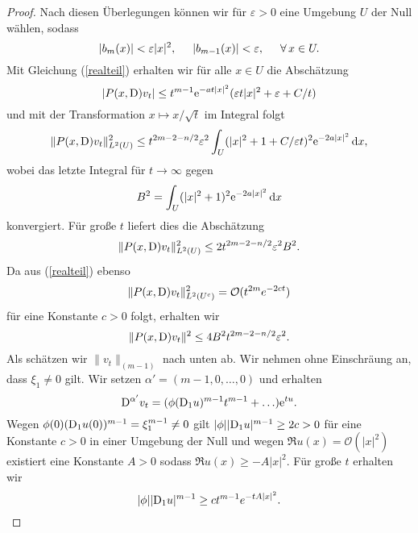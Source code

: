 \begin{proof}
Nach diesen Überlegungen können wir für $\varepsilon >0$ eine Umgebung $U$ der Null wählen, sodass
\begin{equation}
|b_m(x)| < \varepsilon |x|^2, \hspace{0.5cm} |b_{m-1}(x)| < \varepsilon, \hspace{0.5cm} \forall \, x \in U.
\end{equation}
Mit Gleichung (\ref{realteil}) erhalten wir für alle $x\in U$ die Abschätzung
\begin{equation}
|P(x,\mathrm D)v_t| \le t^{m-1} \mathrm e^{-at|x|^2}(\varepsilon t |x|^2 + \varepsilon + C/t)
\end{equation}
und mit der Transformation $x \mapsto x/\sqrt{t}$ im Integral folgt
\begin{equation}
\lVert P(x,\mathrm D) v_t \rVert_{L^2(U)} ^2 \le t^{2m-2-n/2} \varepsilon^2 \int_U (|x|^2 + 1 +C/\varepsilon t)^2 \mathrm e^{-2a|x|^2} \,\mathrm d x,
\end{equation}
wobei das letzte Integral für $t \rightarrow \infty$ gegen
\begin{equation}
B^2 = \int_U (|x|^2 + 1)^2 \mathrm e^{-2a|x|^2} \,\mathrm d x
\end{equation}
konvergiert. Für große $t$ liefert dies die Abschätzung
\begin{equation}
\lVert P(x,\mathrm D) v_t \rVert_{L^2(U)} ^2 \le 2 t^{2m-2-n/2} \varepsilon^2  B^2.
\end{equation}
Da aus (\ref{realteil}) ebenso
\begin{equation}
\lVert P(x,\mathrm D) v_t \rVert_{L^2(U^c)} ^2 = \mathcal{O}(t^{2m}e^{-2ct})
\end{equation}
für eine Konstante $c>0$ folgt, erhalten wir
\begin{equation}
	\label{4.18}
\lVert P(x,\mathrm D) v_t \rVert^2 \le 4 B^2 t^{2m-2-n/2} \varepsilon^2.
\end{equation}
Als schätzen wir $\lVert v_t \rVert_{(m-1)}$ nach unten ab. Wir nehmen ohne Einschräung an, dass $\xi_1\neq 0$ gilt. Wir setzen $\alpha' = (m-1,0,\ldots,0)$ und erhalten
\begin{equation}
\mathrm D^{\alpha'} v_t = (\phi (\mathrm D_1 u)^{m-1}t^{m-1}+ \ldots)\mathrm e^{tu}.
\end{equation}
Wegen $\phi(0) (\mathrm D_1u(0))^{m-1} = \xi_1^{m-1} \neq 0$ gilt $|\phi| |\mathrm D_1u|^{m-1} \ge 2c > 0$ für eine Konstante $c > 0$ in einer Umgebung der Null und wegen $\Re u(x) = \mathcal{O} (|x|^2)$ existiert eine Konstante $A > 0$ sodass $\Re u(x) \ge -A |x|^2$. Für große $t$ erhalten wir
\begin{equation}
|\phi| |\D_1u|^{m-1} \ge ct^{m-1}e^{-tA|x|^2}.

\end{equation}
\end{proof}
